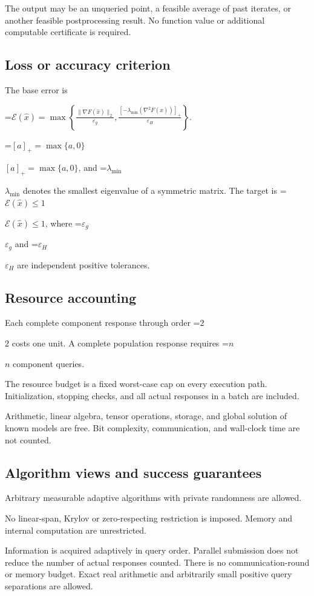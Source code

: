 \documentclass[10pt,a4paper]{article}
\newcommand{\AtlasMath}[1]{\par\begingroup\centering\setbox0=\hbox{$\displaystyle #1$}\ifdim\wd0>1.4\linewidth\typeout{ATLAS WIDE FORMULA: \the\wd0}\fi\ifdim\wd0>\linewidth\resizebox{\linewidth}{!}{\box0}\else\box0\fi\par\endgroup}
\newcommand{\AtlasInlineMath}[1]{\begingroup\setbox0=\hbox{$#1$}\ifdim\wd0>.4\linewidth\endgroup\AtlasMath{#1}\else\endgroup$#1$\fi}
\begin{document}
The output may be an unqueried point, a feasible average of past iterates, or another feasible postprocessing result. No function value or additional computable certificate is required.

\subsection{Loss or accuracy criterion}
The base error is


\AtlasMath{\mathcal{E}(\widehat{x})=\max\left\{\frac{\|\nabla F(\widehat{x})\|_2}{\varepsilon_g},\frac{[-\lambda_{\min}(\nabla^2F(\widehat{x}))]_+}{\varepsilon_H}\right\}.}


\AtlasInlineMath{[a]_+=\max\{a,0\}}, and \AtlasInlineMath{\lambda_{\min}} denotes the smallest eigenvalue of a symmetric matrix. The target is \AtlasInlineMath{\mathcal{E}(\widehat{x})\le1}, where \AtlasInlineMath{\varepsilon_g} and \AtlasInlineMath{\varepsilon_H} are independent positive tolerances.

\subsection{Resource accounting}
Each complete component response through order \AtlasInlineMath{2} costs one unit. A complete population response requires \AtlasInlineMath{n} component queries.

The resource budget is a fixed worst-case cap on every execution path. Initialization, stopping checks, and all actual responses in a batch are included.

Arithmetic, linear algebra, tensor operations, storage, and global solution of known models are free. Bit complexity, communication, and wall-clock time are not counted.

\subsection{Algorithm views and success guarantees}
Arbitrary measurable adaptive algorithms with private randomness are allowed.

No linear-span, Krylov or zero-respecting restriction is imposed. Memory and internal computation are unrestricted.

Information is acquired adaptively in query order. Parallel submission does not reduce the number of actual responses counted. There is no communication-round or memory budget. Exact real arithmetic and arbitrarily small positive query separations are allowed.
\end{document}
